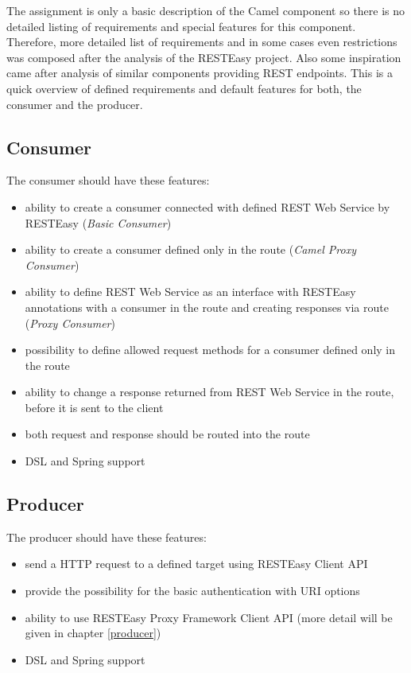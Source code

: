 \documentclass[12pt,final,oneside]{fithesis2}
\begin{document}
The assignment is only a basic description of the Camel component so there is no detailed listing of requirements and special features for this component. Therefore, more detailed list of requirements and in some cases even restrictions was composed after the analysis of the RESTEasy project. Also some inspiration came after analysis of similar components providing REST endpoints. This is a quick overview of defined requirements and default features for both, the consumer and the producer.

\subsection{Consumer}
The consumer should have these features:

\begin{itemize}
\item
ability to create a consumer connected with defined REST Web Service by RESTEasy (\textit{Basic Consumer})

\item
ability to create a consumer defined only in the route (\textit{Camel Proxy Consumer})

\item
ability to define REST Web Service as an interface with RESTEasy annotations with a consumer in the route and creating responses via route (\textit{Proxy Consumer})

\item
possibility to define allowed request methods for a consumer defined only in the route


\item
ability to change a response returned from REST Web Service in the route, before it is sent to the client 

\item
both request and response should be routed into the route

\item
DSL and Spring support


\end{itemize}

\subsection{Producer}
The producer should have these features:
\begin{itemize}
\item
send a HTTP request to a defined target using RESTEasy Client API

\item
provide the possibility for the basic authentication with URI options

\item
ability to use RESTEasy Proxy Framework Client API (more detail will be given in chapter \ref{producer})

\item
DSL and Spring support
\end{itemize}
\end{document}
